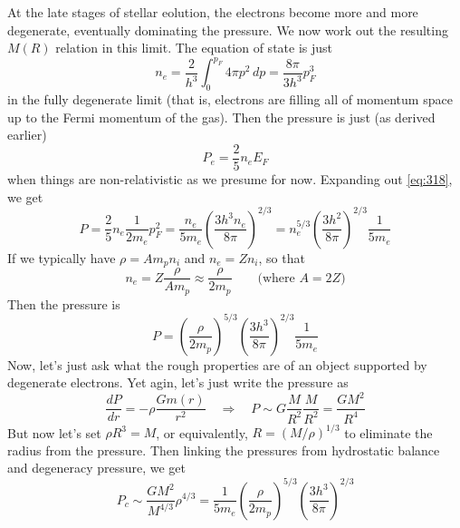 \documentclass[10pt]{article}
\numberwithin{equation}{section}
\begin{document}
    At the late stages of stellar eolution, the electrons become more
    and more degenerate, eventually dominating the pressure. We now
    work out the resulting $M(R)$ relation in this limit. The equation
    of state is just
    \begin{equation}
      \label{eq:317}
      n_e=\frac{2}{h^3}\int_0^{p_F} 4\pi p^2\,dp=\frac{8\pi}{3h^3}p_F^3
    \end{equation}
    in the fully degenerate limit (that is, electrons are filling all
    of momentum space up to the Fermi momentum of the gas). Then the
    pressure is just (as derived earlier)
    \begin{equation}
      \label{eq:318}
      P_e=\frac{2}{5}n_e E_F
    \end{equation}
    when things are non-relativistic as we presume for now. Expanding
    out \eqref{eq:318}, we get
    \begin{equation}
      \label{eq:319}
      P=\frac{2}{5}n_e\frac{1}{2 m_e}p_F^2=\frac{n_e}{5
        m_e}\left(\frac{3h^3n_e}{8\pi}\right)^{2/3}=n_e^{5/3}\left(\frac
{3h^2}{8\pi}\right)^{2/3}\frac{1}{5 m_e}
    \end{equation}
    If we typically have $\rho=A m_pn_i$ and $n_e=Zn_i$, so that
    \begin{equation}
      \label{eq:320}
      n_e=Z\frac{\rho}{Am_p}\approx \frac{\rho}{2m_p}\qquad
      \textrm{(where $A=2Z$)}
    \end{equation}
    Then the pressure is
    \begin{equation}
      \label{eq:321}
      P=\left(\frac{\rho}{2m_p}\right)^{5/3}\left(\frac{3h^3}{8\pi}\right)^
{2/3}\frac{1}{5 m_e}
    \end{equation}
    Now, let's just ask what the rough properties are of an object
    supported by degenerate electrons. Yet agin, let's just write the
    pressure as
    \begin{equation}
      \label{eq:322}
      \frac{dP}{dr}=-\rho\frac{Gm(r)}{r^2}\quad\Rightarrow\quad P\sim G
\frac{M}{R^2}\frac{M}{R^2}=\frac{GM^2}{R^4}
    \end{equation}
    But now let's set $\rho R^3=M$, or equivalently,
    $R=(M/\rho)^{1/3}$ to eliminate the radius from the pressure. Then
    linking the pressures from hydrostatic balance and degeneracy
    pressure, we get
    \begin{equation}
      \label{eq:323}
      P_c\sim\frac{GM^2}{M^{4/3}}\rho^{4/3}=\frac{1}{5m_e}\left(\frac{\rho}
{2m_p}\right)^{5/3}\left(\frac{3h^3}{8\pi}\right)^{2/3}
    \end{equation}
\end{document}
